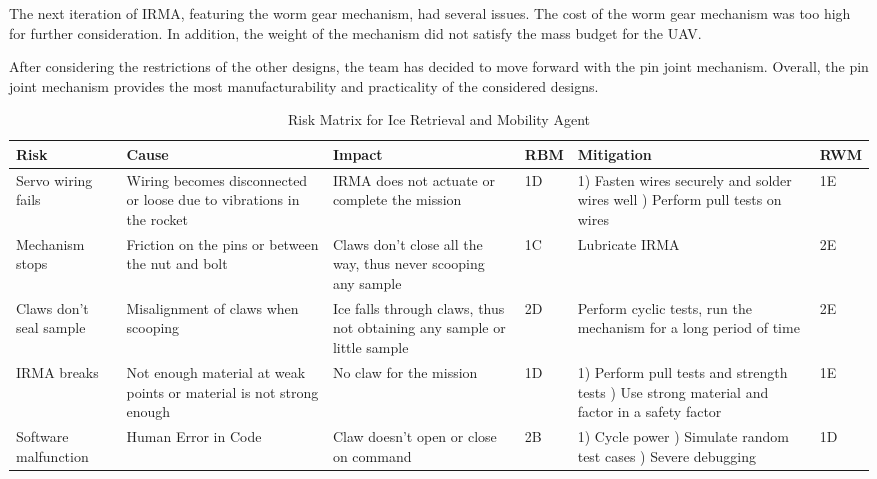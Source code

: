 			The next iteration of IRMA, featuring the worm gear mechanism, had several issues. The cost of the worm gear mechanism was too high for further consideration. In addition, the weight of the mechanism did not satisfy the mass budget for the UAV. 

			After considering the restrictions of the other designs, the team has decided to move forward with the pin joint mechanism. Overall, the pin joint mechanism provides the most manufacturability and practicality of the considered designs. 
			\begin{table}[]
				\label{IRMA}
				{\footnotesize
				\caption{Risk Matrix for Ice Retrieval and Mobility Agent}
				\centering
				\begin{tabularx}{\linewidth}{XXXlXl}
				\toprule
				\textbf{Risk}                                            & \textbf{Cause}                                                                                                                 & \textbf{Impact}                                                                                                                           & \textbf{RBM}  & \textbf{Mitigation}                                                                                                                                                                                     & \textbf{RWM} \\
				\midrule
				Servo wiring fails & Wiring becomes disconnected or loose due to vibrations in the rocket & IRMA does not actuate or complete the mission & \cellcolor{orange!25} 1D & 1) Fasten wires securely and solder wires well \newline 2) Perform pull tests on wires & \cellcolor{green!25} 1E \\
				Mechanism stops & Friction on the pins or between the nut and bolt & Claws don’t close all the way, thus never scooping any sample & \cellcolor{red!25} 1C & Lubricate IRMA & \cellcolor{green!25} 2E \\
				Claws don’t seal sample & Misalignment of claws when scooping & Ice falls through claws, thus not obtaining any sample or little sample & \cellcolor{orange!25} 2D & Perform cyclic tests, run the mechanism for a long period of time & \cellcolor{green!25} 2E \\
				IRMA breaks & Not enough material at weak points or material is not strong enough & No claw for the mission & \cellcolor{orange!25} 1D & 1) Perform pull tests and strength tests \newline 2) Use strong material and factor in a safety factor & \cellcolor{green!25} 1E \\
				Software malfunction & Human Error in Code & Claw doesn’t open or close on command & \cellcolor{red!25} 2B & 1) Cycle power \newline 2) Simulate random test cases \newline 3) Severe debugging & \cellcolor{orange!25} 1D \\
				\bottomrule
				\end{tabularx}
				}
			\end{table}

